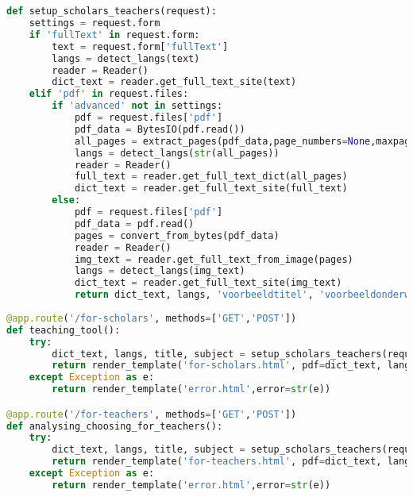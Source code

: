 \chapter{}%
\label{ch:bijlage-code-2}

\begin{lstlisting}[language=Python, caption={Koppeling tussen front-end en back-end voor het inlezen van een wetenschappelijk artikel}, label={code:inlezen-wetenschappelijk-artikel-front-end-back-end}]
def setup_scholars_teachers(request):
	settings = request.form
	if 'fullText' in request.form:
		text = request.form['fullText']
		langs = detect_langs(text)
		reader = Reader()
		dict_text = reader.get_full_text_site(text)                
	elif 'pdf' in request.files:
		if 'advanced' not in settings:
			pdf = request.files['pdf']
			pdf_data = BytesIO(pdf.read())
			all_pages = extract_pages(pdf_data,page_numbers=None,maxpages=999)
			langs = detect_langs(str(all_pages))
			reader = Reader()
			full_text = reader.get_full_text_dict(all_pages)
			dict_text = reader.get_full_text_site(full_text)
		else:
			pdf = request.files['pdf']
			pdf_data = pdf.read()
			pages = convert_from_bytes(pdf_data)
			reader = Reader()
			img_text = reader.get_full_text_from_image(pages)
			langs = detect_langs(img_text)
			dict_text = reader.get_full_text_site(img_text)                            
			return dict_text, langs, 'voorbeeldtitel', 'voorbeeldonderwerp'
			
@app.route('/for-scholars', methods=['GET','POST'])
def teaching_tool():
	try:
		dict_text, langs, title, subject = setup_scholars_teachers(request)
		return render_template('for-scholars.html', pdf=dict_text, lang=langs, title=title, subject=subject)
	except Exception as e:
		return render_template('error.html',error=str(e))

@app.route('/for-teachers', methods=['GET','POST'])
def analysing_choosing_for_teachers():
	try:
		dict_text, langs, title, subject = setup_scholars_teachers(request)
		return render_template('for-teachers.html', pdf=dict_text, lang=langs, title=title, subject=subject)
	except Exception as e:
		return render_template('error.html',error=str(e))
\end{lstlisting}

\newpage

